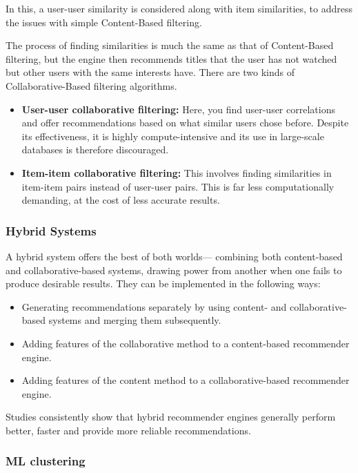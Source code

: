 \documentclass{article}
\begin{document}
In this, a user-user similarity is considered along with item similarities, to address the issues with simple Content-Based filtering.

\medskip

The process of finding similarities is much the same as that of Content-Based filtering, but the engine then recommends titles that the user has not watched but other users with the same interests have. There are two kinds of Collaborative-Based filtering algorithms.

\begin{itemize}
    \item{\textbf{User-user collaborative filtering:} Here, you find user-user correlations and offer recommendations based on what similar users chose before. Despite its effectiveness, it is highly compute-intensive and its use in large-scale databases is therefore discouraged.}
    \item{\textbf{Item-item collaborative filtering:} This involves finding similarities in item-item pairs instead of user-user pairs. This is far less computationally demanding, at the cost of less accurate results.}
\end{itemize}

\subsubsection{Hybrid Systems}

A hybrid system offers the best of both worlds— combining both content-based and collaborative-based systems, drawing power from another when one fails to produce desirable results. They can be implemented in the following ways:

\begin{itemize}
    \item{Generating recommendations separately by using content- and collaborative-based systems and merging them subsequently.}
    \item{Adding features of the collaborative method to a content-based recommender engine.}
    \item{Adding features of the content method to a collaborative-based recommender engine.}
\end{itemize}

Studies consistently show that hybrid recommender engines generally perform better, faster and provide more reliable recommendations.

\subsubsection{ML clustering}
\end{document}
